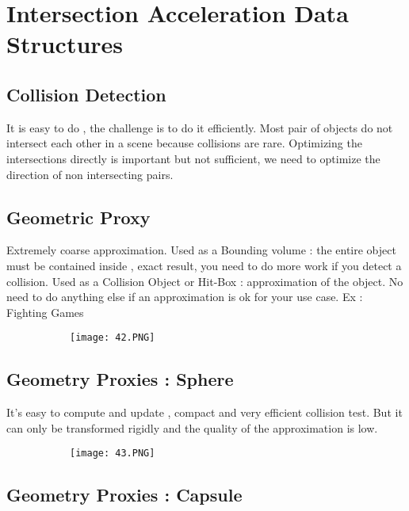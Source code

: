 \documentclass{article}
\begin{document}
\section{Intersection Acceleration Data Structures}
\subsection{Collision Detection}

It is easy to do , the challenge is to do it efficiently. Most pair of objects do not intersect each other in a scene because collisions are rare. Optimizing the intersections directly is important but not sufficient, we need to optimize the direction of non intersecting pairs.

\subsection{Geometric Proxy}
Extremely coarse approximation. Used as a Bounding volume : the entire object must be contained inside , exact result, you need to do more work if you detect a collision.
Used as a Collision Object or Hit-Box : approximation of the object. No need to do anything else if an approximation is ok for your use case. Ex : Fighting Games

\begin{figure}[ht!]
  \centering
  \begin{subfigure}[b]{0.2\linewidth}
    \texttt{[image: 42.PNG]}
  \end{subfigure}
\end{figure}

\vspace{3mm}

\subsection{Geometry Proxies : Sphere}

It's easy to compute and update , compact and very efficient collision test. But it can only be transformed rigidly and the quality of the approximation is low.

\begin{figure}[ht!]
  \centering
  \begin{subfigure}[b]{0.1\linewidth}
    \texttt{[image: 43.PNG]}
  \end{subfigure}
\end{figure}

\subsection{Geometry Proxies : Capsule}
\end{document}
